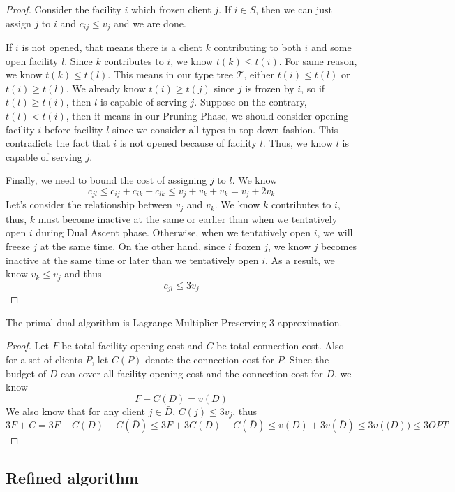 \begin{proof}
Consider the facility $i$ which frozen client $j$. If $i \in S$, then we can just assign $j$ to $i$ and $c_{ij} \le v_j$ and we are done.

If $i$ is not opened, that means there is a client $k$ contributing to both $i$ and some open facility $l$. Since $k$ contributes to $i$, we know $t(k) \le t(i)$. For same reason, we know $t(k) \le t(l)$. This means in our type tree $\mathcal{T}$, either $t(i) \le t(l)$ or $t(i) \ge t(l)$.
We already know $t(i) \ge t(j)$ since $j$ is frozen by $i$, so if $t(l) \ge t(i)$, then $l$ is capable of serving $j$.
Suppose on the contrary, $t(l) < t(i)$, then it means in our Pruning Phase, we should consider opening facility $i$ before facility $l$
since we consider all types in top-down fashion.
This contradicts the fact that $i$ is not opened because of facility $l$.
Thus, we know $l$ is capable of serving $j$.

Finally, we need to bound the cost of assigning $j$ to $l$. We know
\[  c_{jl} \le c_{ij} + c_{ik} + c_{lk} \le v_j + v_k + v_k = v_j + 2v_k    \]
Let's consider the relationship between $v_j$ and $v_k$.
We know $k$ contributes to $i$, thus, $k$ must become inactive at the same or earlier than when we tentatively open $i$ during Dual Ascent phase.
Otherwise, when we tentatively open $i$, we will freeze $j$ at the same time.
On the other hand, since $i$ frozen $j$, we know $j$ becomes inactive at the same time or later than we tentatively open $i$.
As a result, we know $v_k \le v_j$ and thus
\[  c_{jl} \le 3v_j \]

\end{proof}

\begin{thm}
The primal dual algorithm is Lagrange Multiplier Preserving 3-approximation.
\end{thm}
\begin{proof}
Let $F$ be total facility opening cost and $C$ be total connection cost.
Also for a set of clients $P$, let $C(P)$ denote the connection cost for $P$.
Since the budget of $D$ can cover all facility opening cost and the connection cost for $D$, we know
\[  F + C(D) = v(D) \]
We also know that for any client $j \in \bar D$, $C(j) \le 3 v_j$, thus
\[  3F + C = 3F + C(D) + C(\bar D) \le 3F + 3C(D) + C(\bar D) \le v(D) + 3v(\bar D) \le 3v(\mathcal(D)) \le 3 OPT  \]
\end{proof}

\subsection{Refined algorithm}

